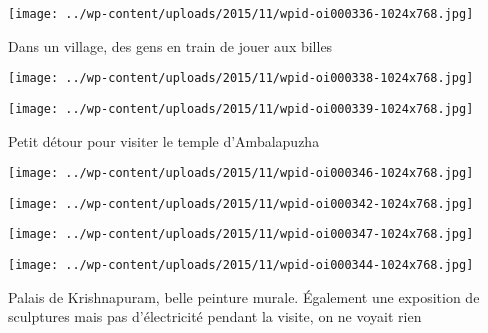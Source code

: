  

 

\begin{center} \texttt{[image: ../wp-content/uploads/2015/11/wpid-oi000336-1024x768.jpg]} \end{center}

 

 Dans un village, des gens en train de jouer aux billes 

 

\begin{center} \texttt{[image: ../wp-content/uploads/2015/11/wpid-oi000338-1024x768.jpg]} \end{center}

 

 

\begin{center} \texttt{[image: ../wp-content/uploads/2015/11/wpid-oi000339-1024x768.jpg]} \end{center}

 

 Petit détour pour visiter le temple d'Ambalapuzha 

 

\begin{center} \texttt{[image: ../wp-content/uploads/2015/11/wpid-oi000346-1024x768.jpg]} \end{center}

 

 

\begin{center} \texttt{[image: ../wp-content/uploads/2015/11/wpid-oi000342-1024x768.jpg]} \end{center}

 

 

\begin{center} \texttt{[image: ../wp-content/uploads/2015/11/wpid-oi000347-1024x768.jpg]} \end{center}

 

 

\begin{center} \texttt{[image: ../wp-content/uploads/2015/11/wpid-oi000344-1024x768.jpg]} \end{center}

 

 Palais de Krishnapuram, belle peinture murale. Également une exposition de sculptures mais pas d'électricité pendant la visite, on ne voyait rien 

